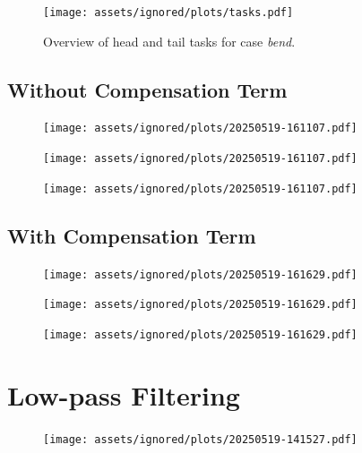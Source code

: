 \begin{figure}[!ht]
    \centering
    \texttt{[image: assets/ignored/plots/tasks.pdf]}
    \caption{Overview of head and tail tasks for case \textit{bend}.}
    \label{fig:eelume:tpc:tasks:bend}
\end{figure}


\subsection{Without Compensation Term}

\begin{figure}[!ht]
    \centering
    \texttt{[image: assets/ignored/plots/20250519-161107.pdf]}
    \caption{}
    \label{fig:results:tpc:bend:1:pos}
\end{figure}

\begin{figure}[!ht]
    \centering
    \texttt{[image: assets/ignored/plots/20250519-161107.pdf]}
    \caption{}
    \label{fig:results:tpc:bend:1:pos}
\end{figure}

\begin{figure}[!ht]
    \centering
    \texttt{[image: assets/ignored/plots/20250519-161107.pdf]}
    \caption{}
    \label{fig:results:tpc:bend:1:pos}
\end{figure}



\FloatBarrier


\subsection{With Compensation Term}

\begin{figure}[!ht]
    \centering
    \texttt{[image: assets/ignored/plots/20250519-161629.pdf]}
    \caption{}
    \label{fig:results:tpc:bend:1:pos}
\end{figure}

\begin{figure}[!ht]
    \centering
    \texttt{[image: assets/ignored/plots/20250519-161629.pdf]}
    \caption{}
    \label{fig:results:tpc:bend:1:pos}
\end{figure}

\begin{figure}[!ht]
    \centering
    \texttt{[image: assets/ignored/plots/20250519-161629.pdf]}
    \caption{}
    \label{fig:results:tpc:bend:1:pos}
\end{figure}

\FloatBarrier


\section{Low-pass Filtering}
\label{sec:results:lowpass}
\begin{figure}[h!]
    \centering
    \texttt{[image: assets/ignored/plots/20250519-141527.pdf]}
    \caption{}
    \label{fig:results:tpc:stretch:1:task:3}
\end{figure}


\label{sec:results:lowpass_filtering}
